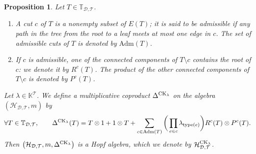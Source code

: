 \documentclass[10pt,a4paper]{amsart}
\numberwithin{equation}{section}
\newtheorem{Proposition}[Theorem]{Proposition}
 { \theoremstyle{definition}
\newtheorem{Definition}[Theorem]{Definition}
\newtheorem{Note}[Theorem]{Note}
\newtheorem{Example}[Theorem]{Example}
\newtheorem{Remark}[Theorem]{Remark}
\newtheorem{Notation}[Theorem]{Notation}}
\newcommand{\K}{\mathbb{K}}
\newcommand{\T}{\mathcal{T}}
\newcommand{\D}{\mathcal{D}}
\newcommand{\adm}{\mathrm{Adm}}
\newcommand{\h}{\mathcal{H}}
\newcommand{\bfT}{\mathbb{T}}
\newcommand{\type}{\mathrm{type}}
\begin{document}
\begin{Proposition}
Let $T\in \bfT_{\D,\T}$. \begin{enumerate}\itemsep=0pt
\item[$1.$] A cut $c$ of $T$ is a nonempty subset of $E(T)$; it is said to be admissible
if any path in the tree from the root to a leaf
meets at most one edge in $c$. The set of admissible cuts of $T$ is denoted by $\adm(T)$.
\item[$2.$] If $c$ is admissible, one of the connected components of $T\setminus c$ contains the root of $c$:
we denote it by $R^c(T)$. The product of the other connected components of $T\setminus c$ is denoted by $P^c(T)$.
\end{enumerate}
Let $\lambda\in \K^\T$. We define a multiplicative coproduct $\Delta^{{\rm CK}_\lambda}$ on the algebra $(\h_{\D,\T},m)$ by
\begin{gather*}
\forall T\in \bfT_{\D,\T},\qquad
\Delta^{{\rm CK}_\lambda}(T)=T\otimes 1+1\otimes T+\sum_{c\in \adm(T)}
\bigg(\prod_{e\in c}\lambda_{\type(e)}\bigg) R^c(T)\otimes P^c(T).
\end{gather*}
Then $\big(\h_{\D,\T},m,\Delta^{{\rm CK}_\lambda}\big)$ is a Hopf algebra, which we denote by $\h_{\D,\T}^{{\rm CK}_\lambda}$.
\end{Proposition}
\end{document}
